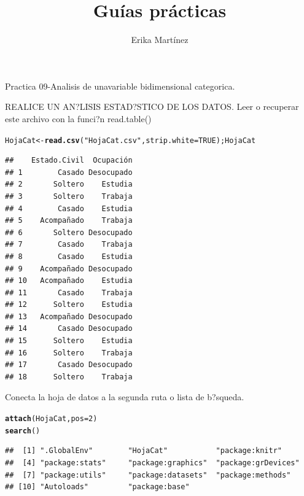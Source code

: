 \documentclass[10pt,a4paper]{article}\usepackage[]{graphicx}\usepackage[]{color}
\author{Erika Martínez}
\title{Guías prácticas}
\makeatletter
\newcommand{\hlnum}[1]{\textcolor[rgb]{0.686,0.059,0.569}{#1}}%
\newcommand{\hlstr}[1]{\textcolor[rgb]{0.192,0.494,0.8}{#1}}%
\newcommand{\hlstd}[1]{\textcolor[rgb]{0.345,0.345,0.345}{#1}}%
\newcommand{\hlkwb}[1]{\textcolor[rgb]{0.69,0.353,0.396}{#1}}%
\newcommand{\hlkwc}[1]{\textcolor[rgb]{0.333,0.667,0.333}{#1}}%
\newcommand{\hlkwd}[1]{\textcolor[rgb]{0.737,0.353,0.396}{\textbf{#1}}}%
\newenvironment{kframe}{%
 \def\at@end@of@kframe{}%
 \ifinner\ifhmode%
  \def\at@end@of@kframe{\end{minipage}}%
  \begin{minipage}{\columnwidth}%
 \fi\fi%
 \def\FrameCommand##1{\hskip\@totalleftmargin \hskip-\fboxsep
 \colorbox{shadecolor}{##1}\hskip-\fboxsep
     \hskip-\linewidth \hskip-\@totalleftmargin \hskip\columnwidth}%
 \MakeFramed {\advance\hsize-\width
   \@totalleftmargin\z@ \linewidth\hsize
   \@setminipage}}%
 {\par\unskip\endMakeFramed%
 \at@end@of@kframe}
\newenvironment{knitrout}{}{} %
\makeatother
\begin{document}
\maketitle
\newpage

Practica 09-Analisis de unavariable bidimensional categorica.

REALICE UN AN?LISIS ESTAD?STICO DE LOS DATOS.
Leer o recuperar este archivo con la funci?n read.table() 
\begin{knitrout}
\color{fgcolor}\begin{kframe}
\begin{alltt}
\hlstd{HojaCat} \hlkwb{<-} \hlkwd{read.csv}\hlstd{(}\hlstr{"HojaCat.csv"}\hlstd{,} \hlkwc{strip.white}\hlstd{=}\hlnum{TRUE}\hlstd{);HojaCat}
\end{alltt}
\begin{verbatim}
##    Estado.Civil  Ocupación
## 1        Casado Desocupado
## 2       Soltero    Estudia
## 3       Soltero    Trabaja
## 4        Casado    Estudia
## 5    Acompañado    Trabaja
## 6       Soltero Desocupado
## 7        Casado    Trabaja
## 8        Casado    Estudia
## 9    Acompañado Desocupado
## 10   Acompañado    Estudia
## 11       Casado    Trabaja
## 12      Soltero    Estudia
## 13   Acompañado Desocupado
## 14       Casado Desocupado
## 15      Soltero    Estudia
## 16      Soltero    Trabaja
## 17       Casado Desocupado
## 18      Soltero    Trabaja
\end{verbatim}
\end{kframe}
\end{knitrout}

Conecta la hoja de datos a la segunda ruta o lista de b?squeda. 
\begin{knitrout}
\color{fgcolor}\begin{kframe}
\begin{alltt}
\hlkwd{attach}\hlstd{(HojaCat,} \hlkwc{pos}\hlstd{=}\hlnum{2}\hlstd{)}
\hlkwd{search}\hlstd{()}
\end{alltt}
\begin{verbatim}
##  [1] ".GlobalEnv"        "HojaCat"           "package:knitr"    
##  [4] "package:stats"     "package:graphics"  "package:grDevices"
##  [7] "package:utils"     "package:datasets"  "package:methods"  
## [10] "Autoloads"         "package:base"
\end{verbatim}
\end{kframe}
\end{knitrout}
\end{document}
